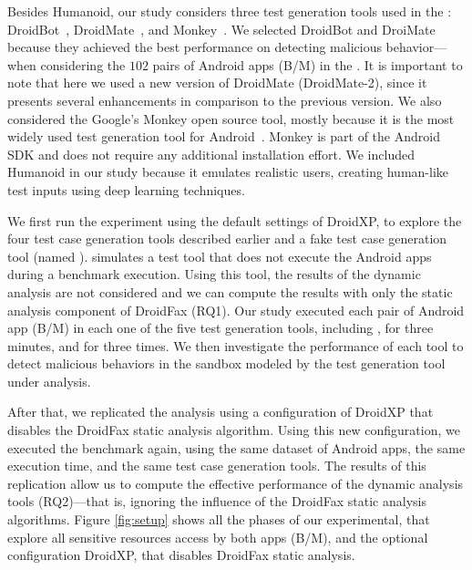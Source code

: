 Besides Humanoid, our study considers three test generation tools used in the \blls: DroidBot~\cite{DBLP:conf/icse/LiYGC17},
DroidMate~\cite{DBLP:conf/icse/JamrozikZ16}, and Monkey~\cite{Monkey}. We selected DroidBot and DroiMate because they achieved
the best performance on detecting malicious behavior---when considering the $102$ pairs of Android apps (B/M) in the \blls.
It is important to note that here we used a new version of DroidMate (DroidMate-2), since it presents several enhancements
in comparison to the previous version. We also considered the Google's Monkey open source tool, mostly because it is the most
widely used test generation tool for Android~\cite{DBLP:conf/sigsoft/ZengLZXDLYX16}. Monkey is part of the Android SDK
and does not require any additional installation effort. We included Humanoid in our study
because it emulates realistic users, creating human-like test inputs using deep learning techniques.




We first run the experiment using the default
settings of DroidXP, to explore the four test case generation tools described earlier and a fake test
case generation tool (named \joke). \joke simulates a test tool that does not execute
the Android apps during a benchmark execution. Using this tool, the results
of the dynamic analysis are not considered and we can compute the results with
only the static analysis component of DroidFax (RQ1). Our study executed each pair of
Android app (B/M) in each one of the five test generation tools, including \joke,
for three minutes, and for three times. We then investigate the performance of each tool to detect malicious behaviors in the sandbox
modeled by the test generation tool
under analysis. 


After that, we replicated the analysis using a configuration of DroidXP that disables the DroidFax static analysis algorithm.
Using this new configuration, we executed the benchmark again, using the same dataset of Android apps, the same execution time,
and the same test case generation tools.
The results of this replication allow us to compute the effective performance
of the dynamic analysis tools (RQ2)---that is, ignoring the influence of the
DroidFax static analysis algorithms.
Figure \ref{fig:setup} shows all the phases of our experimental, that explore all sensitive
resources access by both apps (B/M), and the optional configuration DroidXP, that disables DroidFax static analysis.


